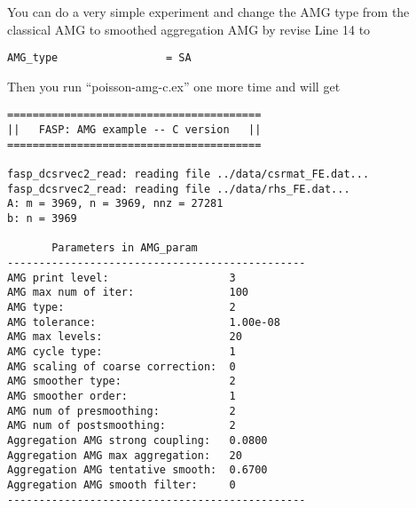 \documentclass[11pt]{memoir}
\begin{document}
You can do a very simple experiment and change the AMG type from the classical AMG to smoothed aggregation AMG by revise Line 14 to
%
\begin{lstlisting}[numbers=none]
AMG_type                 = SA
\end{lstlisting}
%
Then you run ``poisson-amg-c.ex'' one more time and will get
%
\begin{lstlisting}[numbers=none]
========================================
||   FASP: AMG example -- C version   ||
========================================

fasp_dcsrvec2_read: reading file ../data/csrmat_FE.dat...
fasp_dcsrvec2_read: reading file ../data/rhs_FE.dat...
A: m = 3969, n = 3969, nnz = 27281
b: n = 3969

       Parameters in AMG_param
-----------------------------------------------
AMG print level:                   3
AMG max num of iter:               100
AMG type:                          2
AMG tolerance:                     1.00e-08
AMG max levels:                    20
AMG cycle type:                    1
AMG scaling of coarse correction:  0
AMG smoother type:                 2
AMG smoother order:                1
AMG num of presmoothing:           2
AMG num of postsmoothing:          2
Aggregation AMG strong coupling:   0.0800
Aggregation AMG max aggregation:   20
Aggregation AMG tentative smooth:  0.6700
Aggregation AMG smooth filter:     0
-----------------------------------------------



\end{lstlisting}
\end{document}
